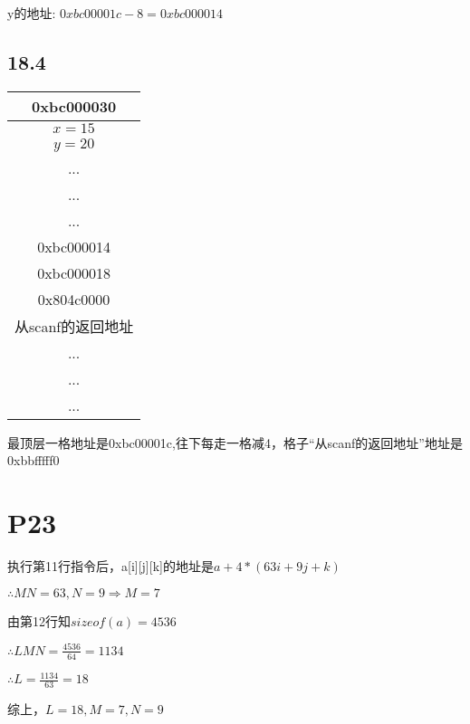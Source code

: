 \documentclass{article}
\begin{document}
y的地址: $0xbc00001c-8=0xbc000014$

\newpage
\subsection{18.4}
\begin{table}[h!]
	\begin{center}
	  \begin{tabular}{|c|} %
		\hline
		0xbc000030 \\
		\hline
		$x=15$\\
		\hline
		$y=20$\\
		\hline
		...\\
		\hline
		...\\
		\hline
		...\\
		\hline
		0xbc000014\\
		\hline
		0xbc000018\\
		\hline
		0x804c0000\\
		\hline
		从scanf的返回地址\\
		\hline
		...\\
		\hline
		...\\
		\hline
		...\\
	  \end{tabular}
	\end{center}
\end{table}
最顶层一格地址是0xbc00001c,往下每走一格减4，格子“从scanf的返回地址”地址是0xbbfffff0
\section{P23}
执行第11行指令后，a[i][j][k]的地址是$a+4*(63i+9j+k)$

$\therefore MN=63, N=9 \Rightarrow M=7$

由第12行知$sizeof(a)=4536$

$\therefore LMN= \frac{4536}{64}=1134$

$\therefore L=\frac{1134}{63}=18$

综上，$L=18,M=7,N=9$

\newpage
\end{document}
